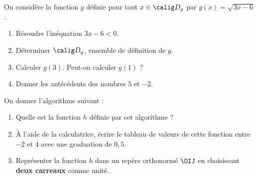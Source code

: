 \documentclass[10pt,openright,twoside,french]{book}
\begin{document}
\exo On considère la fonction $g$ définie pour tout $x \in \calig D_g$ par $g(x) = \sqrt{3x - 6}$.
\begin{enumerate}
    \item Résoudre l'inéquation $3x - 6 < 0$.
    \item Déterminer $\calig D_g$, ensemble de définition de $g$.
    \item Calculer $g(3)$. Peut-on calculer $g(1)$ ?
    \item Donner les antécédents des nombres $5$ et $-2$.
\end{enumerate}

\exo\medskip

\begin{minipage}{0.45\linewidth}
On donner l'algorithme suivant :
\begin{center}
\small
\end{center}
\end{minipage}
\begin{minipage}{0.53\linewidth}
\begin{enumerate}
    \item Quelle est la fonction $h$ définie par cet algorithme ?
    \item À l'aide de la calculatrice, écrire le tableau de valeurs de cette fonction entre $-2$ et $4$ avec une graduation de $0,5$.
    \item Représenter la fonction $h$ dans un repère orthonormé $\OIJ$ en choisissant \textbf{deux carreaux} comme unité.
\end{enumerate}
\end{minipage}
\end{document}
